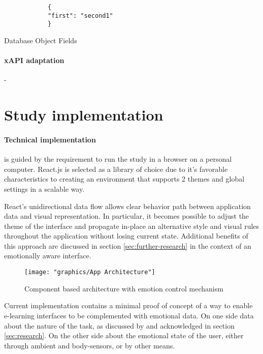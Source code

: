 	\begin{listing}[H]
		\begin{verbatim}
			{
			"first": "second1"
			}
		\end{verbatim}
		\caption{Database Object Fields}
		\label{lst:db_object}
	\end{listing}


		
		\paragraph{xAPI adaptation} - 
		

\section{Study implementation}



\paragraph{Technical implementation} is guided by the requirement to run the study in a browser on a personal computer. React.js is selected as a library of choice due to it's favorable characteristics to creating an environment that supports 2 themes and global settings in a scalable way. 


React's unidirectional data flow allows clear behavior path between application data and visual representation. In particular, it becomes possible to adjust the theme of the interface and propagate in-place an alternative style and visual rules throughout the application without losing current state. Additional benefits of this approach are discussed in section \ref{sec:further-research} in the context of an emotionally aware interface.

\begin{figure}
	\centering
	\texttt{[image: "graphics/App Architecture"]}
	\caption{Component based architecture with emotion control mechanism}
	\label{fig:app-architecture}
\end{figure}

Current implementation contains a minimal proof of concept of a way to enable e-learning interfaces to be complemented with emotional data. On one side data about the nature of the task, as discussed by \cite{Haaranen2015} and acknowledged in section \ref{sec:research}. On the other side about the emotional state of the user, either through ambient and body-sensors, or by other means.

